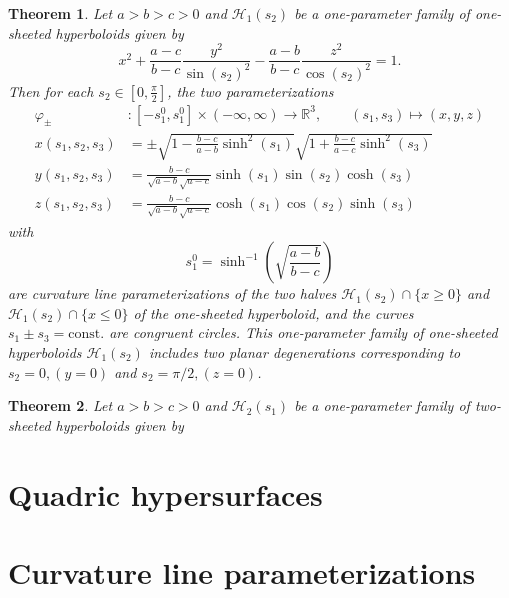 \documentclass[10pt, a4paper]{article}
\theoremstyle{BoldTopSpacing}
\newtheorem{theorem}{Theorem}[section]
\theoremstyle{BoldTopSpacing}
\theoremstyle{BoldTopSpacing}
\theoremstyle{BoldTopBottomSpacing}
\theoremstyle{BoldTopSpacing}
\theoremstyle{BoldTopBottomSpacing}
\theoremstyle{remark}
\begin{document}
\begin{theorem}
\label{thm:isometric-deformation-para-one-hyperboloid}
Let $a > b > c > 0$ and $\mathcal{H}_{1}(s_{2})$ be a one-parameter family of one-sheeted hyperboloids given by
\begin{equation}
x^2 + \frac{a - c}{b - c} \frac{y^2}{\sin(s_{2})^2} -  \frac{a - b}{b - c} \frac{z^2}{ \cos(s_{2})^2} = 1.
\end{equation}
Then for each $s_{2} \in \left[ 0, \frac{\pi}{2} \right]$, the two parameterizations
\begin{align*}
    \varphi_{\pm} &: [-s_{1}^{0}, s_{1}^{0}] \times (-\infty, \infty) \to \mathbb{R}^3, \quad \quad (s_{1}, s_{3}) \mapsto (x, y, z) \\[10pt]
    x(s_{1}, s_{2}, s_{3}) &= \pm \sqrt{1 - \frac{b - c}{a - b} \sinh^2(s_{1})} \sqrt{1 + \frac{b - c}{a - c}\sinh^2(s_{3})} \\[10pt]
    y(s_{1}, s_{2}, s_{3}) &= \frac{b - c}{\sqrt{a - b} \sqrt{a - c}} \sinh(s_{1}) \sin(s_{2})\cosh(s_{3}) \\[10pt]
    z(s_{1}, s_{2}, s_{3}) &= \frac{b - c}{\sqrt{a - b} \sqrt{a - c}}  \cosh(s_{1}) \cos(s_{2}) \sinh(s_{3})
\end{align*}
with
\[
    s_{1}^{0} = \sinh^{-1}\left( \sqrt{ \frac{a - b}{b - c} } \right)
\]
are curvature line parameterizations of the two halves $\mathcal{H}_{1}(s_{2}) \cap \{ x \geq 0\}$ and $\mathcal{H}_{1}(s_{2}) \cap \{ x \leq 0\}$ of the one-sheeted hyperboloid, and the curves $s_{1} \pm s_{3} = \text{const.}$ are congruent circles. \newline
This one-parameter family of one-sheeted hyperboloids $\mathcal{H}_{1}(s_{2})$ includes two planar degenerations corresponding to $s_{2} = 0,\left(y = 0 \right)$ and $s_{2} = \pi/2, \left( z = 0 \right)$.
\end{theorem}

\begin{theorem}
\label{thm:isometric-deformation-para-two-hyperboloid}
Let $a > b > c > 0$ and $\mathcal{H}_{2}(s_{1})$ be a one-parameter family of two-sheeted hyperboloids given by
\end{theorem}
\pagebreak
\appendix
\section{Quadric hypersurfaces}
\label{appendix:quadrics}
\pagebreak
\section{Curvature line parameterizations}
\label{appendix:curvature-lines}
\pagebreak


\pagestyle{tocstyle}


\end{document}
